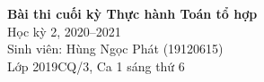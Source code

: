 \documentclass[12pt]{article}
\begin{document}
\begin{center}
    \LARGE{\bfseries Bài thi cuối kỳ Thực hành Toán tổ hợp} \\
    \Large{Học kỳ 2, 2020--2021}\\
    \large{Sinh viên: Hùng Ngọc Phát (19120615)}\\
    \large{Lớp 2019CQ/3, Ca 1 sáng thứ 6}\\[1.5cm]
\end{center}









\renewcommand{\bibname}{Tài liệu tham khảo}


\end{document}
